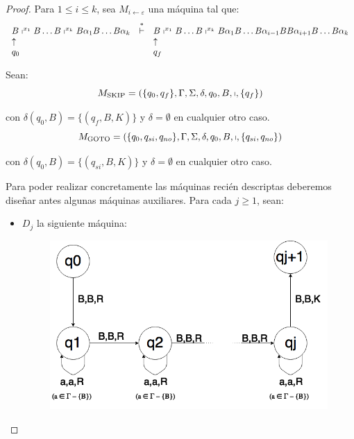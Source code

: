 \begin{proof}
    \PN Para $1 \leq i \leq k$, sea $M_{i\leftarrow \varepsilon}$ una máquina tal que:
		\[
      \begin{array}{lcl}
        B \shortmid^{x_{1}} B \dotsc B \shortmid^{x_{k}} B \alpha_{1} B \dotsc B \alpha_{k} &\overset{\ast}{\vdash}& B
          \shortmid^{x_{1}} B \dotsc B \shortmid^{x_{k}} B \alpha_{1} B \dotsc B \alpha_{i-1} B B \alpha_{i+1} B \dotsc
          B \alpha_{k} \\
        \uparrow && \uparrow \\
        q_{0} & & q_{f}
      \end{array}
    \]

    \PN Sean:
    \[
      M_{\mathrm{SKIP}} = \left(\{q_{0},q_{f}\},\Gamma,\Sigma,\delta,q_{0},B,\shortmid,\{q_{f}\}\right)
    \]

		\PN con $\delta(q_{0},B) = \{(q_{f},B,K)\}$ y $\delta = \emptyset$ en cualquier otro caso.
		\[
      M_{\mathrm{GOTO}} = \left(\{q_{0},q_{si},q_{no}\},\Gamma,\Sigma,\delta,q_{0},B,\shortmid,\{q_{si},q_{no}\}\right)
    \]

    \PN con $\delta(q_{0},B) = \{(q_{si},B,K)\}$ y $\delta = \emptyset$ en cualquier otro caso.

    \vspace{5mm}
    \PN Para poder realizar concretamente las máquinas recién descriptas deberemos diseñar antes algunas máquinas
    auxiliares. Para cada $j \geq 1$, sean:

    \begin{itemize}
      \item $D_{j}$ la siguiente máquina:

        \begin{figure}[h]
          \centering
          \includegraphics[scale=0.4]{graphics/figure_1.png}
        \end{figure}


\end{itemize}
\end{proof}
